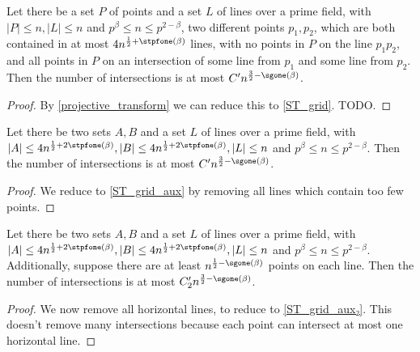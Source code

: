 \begin{theorem}
    \label{ST_prime_field_proj}
    \leanok
    Let there be a set $P$ of points and a set $L$ of lines over a prime field, 
    with $|P| \leq n, |L| \leq n$ and $p^\beta \leq n \leq p^{2 - \beta}$,
    two different points $p_1, p_2$, which are both contained in at most $4 n^{\frac12 + \stpfone(\beta)}$ lines,
    with no points in $P$ on the line $p_1 p_2$, and all points in $P$ on an intersection of some line from $p_1$ and some
    line from $p_2$.
    Then the number of intersections is at most $C' n^{\frac32 - \sgone(\beta)}$.
\end{theorem}

\begin{proof}
    \leanok
    By \ref{projective_transform} we can reduce this to \ref{ST_grid}.
    TODO.
\end{proof}

\begin{theorem}
    \label{ST_grid}
    \leanok
    Let there be two sets $A, B$ and a set $L$ of lines over a prime field, 
    with $|A| \leq 4n^{\frac12 + 2\stpfone(\beta)}, |B| \leq 4n^{\frac12 + 2\stpfone(\beta)}, |L| \leq n$ and $p^\beta \leq n \leq p^{2 - \beta}$.
    Then the number of intersections is at most $C' n^{\frac32 - \sgone(\beta)}$.
\end{theorem}

\begin{proof}
    \leanok
    We reduce to \ref{ST_grid_aux} by removing all lines which contain too few points.
\end{proof}

\begin{theorem}
    \label{ST_grid_aux}
    \leanok
    Let there be two sets $A, B$ and a set $L$ of lines over a prime field, 
    with $|A| \leq 4n^{\frac12 + 2\stpfone(\beta)}, |B| \leq 4n^{\frac12 + 2\stpfone(\beta)}, |L| \leq n$ and $p^\beta \leq n \leq p^{2 - \beta}$.
    Additionally, suppose there are at least $n^{\frac12 - \sgone(\beta)}$ points on each line.
    Then the number of intersections is at most $C'_2 n^{\frac32 - \sgone(\beta)}$.
\end{theorem}

\begin{proof}
    \leanok
    We now remove all horizontal lines, to reduce to \ref{ST_grid_aux₂}.
    This doesn't remove many intersections because each point can intersect at most one horizontal line.
\end{proof}

